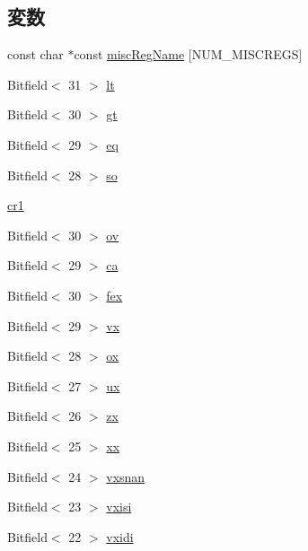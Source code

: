 \subsection*{変数}
\begin{DoxyCompactItemize}
\item 
const char $\ast$const \hyperlink{namespacePowerISA_a25c189cc6686d2796be597f69b3a94a6}{miscRegName} \mbox{[}NUM\_\-MISCREGS\mbox{]}
\item 
Bitfield$<$ 31 $>$ \hyperlink{namespacePowerISA_afaddb364ab967e030e35c845e8f9cc5e}{lt}
\item 
Bitfield$<$ 30 $>$ \hyperlink{namespacePowerISA_a73053d25e50297e1394dd73b90816e43}{gt}
\item 
Bitfield$<$ 29 $>$ \hyperlink{namespacePowerISA_a9d2b59e69f0498a5cc37a71ba578920c}{eq}
\item 
Bitfield$<$ 28 $>$ \hyperlink{namespacePowerISA_afe7194d4c241ed83e4a1f9cdc8e7be0d}{so}
\item 
\hyperlink{namespacePowerISA_a1dae322bf8ef83af996e2e1534f3036d}{cr1}
\item 
Bitfield$<$ 30 $>$ \hyperlink{namespacePowerISA_a186f045af2f938c2fac77f8e6656b693}{ov}
\item 
Bitfield$<$ 29 $>$ \hyperlink{namespacePowerISA_a103ecf74d510034f16278decd1fc9f34}{ca}
\item 
Bitfield$<$ 30 $>$ \hyperlink{namespacePowerISA_a84ae18295720ae3dbeeea2356b67257d}{fex}
\item 
Bitfield$<$ 29 $>$ \hyperlink{namespacePowerISA_aa86e07da1b9cc370b9d96d14eac0a104}{vx}
\item 
Bitfield$<$ 28 $>$ \hyperlink{namespacePowerISA_a624be297d49dd726a1d6b9925a9b9c23}{ox}
\item 
Bitfield$<$ 27 $>$ \hyperlink{namespacePowerISA_a5ebba2175dff4330c2758b038b5fe3b4}{ux}
\item 
Bitfield$<$ 26 $>$ \hyperlink{namespacePowerISA_a75f80cd9a5f37b272b2a7da51b3c779e}{zx}
\item 
Bitfield$<$ 25 $>$ \hyperlink{namespacePowerISA_ab39221d0264eccd80044b720428d5e3e}{xx}
\item 
Bitfield$<$ 24 $>$ \hyperlink{namespacePowerISA_a937a61ea17dcb7eda74cb8b3ae7fb337}{vxsnan}
\item 
Bitfield$<$ 23 $>$ \hyperlink{namespacePowerISA_a5275e27ec511823f31a01f4177b8f56b}{vxisi}
\item 
Bitfield$<$ 22 $>$ \hyperlink{namespacePowerISA_ae5384444aa0a3bd461aa69023dbea786}{vxidi}
\item 

\end{DoxyCompactItemize}
